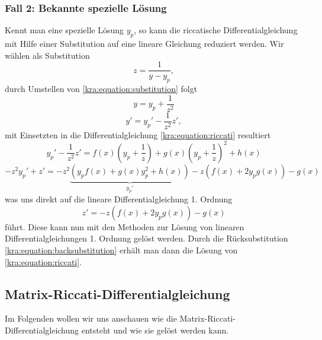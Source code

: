 \subsubsection{Fall 2: Bekannte spezielle Lösung}
Kennt man eine spezielle Lösung $y_p$, so kann die riccatische Differentialgleichung mit Hilfe einer Substitution auf eine lineare Gleichung reduziert werden.
Wir wählen als Substitution
\begin{equation} \label{kra:equation:substitution}
    z = \frac{1}{y - y_p},
\end{equation}
durch Umstellen von \eqref{kra:equation:substitution} folgt
\begin{equation}
    y = y_p + \frac{1}{z^2} \label{kra:equation:backsubstitution}
\end{equation}
\begin{equation}
    y' = y_p' - \frac{1}{z^2}z',
\end{equation}
mit Einsetzten in die Differentialgleichung \eqref{kra:equation:riccati} resultiert
\begin{equation}
    y_p' - \frac{1}{z^2}z' = f(x)(y_p + \frac{1}{z}) + g(x)(y_p + \frac{1}{z})^2 + h(x)
\end{equation}
\begin{equation}
    -z^{2}y_p' + z' = -z^2\underbrace{(y_{p}f(x) + g(x)y_p^2 + h(x))}_{\displaystyle{y_p'}} - z(f(x) + 2y_{p}g(x)) - g(x)
\end{equation}
was uns direkt auf die lineare Differentialgleichung 1. Ordnung
\begin{equation}
    z' = -z(f(x) + 2y_{p}g(x)) - g(x)
\end{equation}
führt.
Diese kann nun mit den Methoden zur Lösung von linearen Differentialgleichungen 1. Ordnung gelöst werden.
Durch die Rücksubstitution \eqref{kra:equation:backsubstitution} erhält man dann die Lösung von \eqref{kra:equation:riccati}.

\subsection{Matrix-Riccati-Differentialgleichung} \label{kra:loesung:riccati}
Im Folgenden wollen wir uns anschauen wie die Matrix-Riccati-Differentialgleichung entsteht und wie sie gelöst werden kann.

